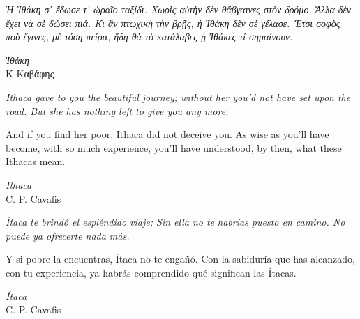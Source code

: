 
%
%
%
\vspace*{0.05\pageheight}
 \setmainfont{CMU Serif}
\epigraph{\itshape
Ἡ Ἰθάκη σ᾿ ἔδωσε τ᾿ ὡραῖο ταξίδι.\linebreak
Χωρὶς αὐτὴν δὲν θἄβγαινες στὸν δρόμο.\linebreak
Ἄλλα δὲν ἔχει νὰ σὲ δώσει πιά.\linebreak\linebreak
Κι ἂν πτωχικὴ τὴν βρῇς, ἡ Ἰθάκη δὲν σὲ γέλασε.\linebreak
Ἔτσι σοφὸς ποὺ ἔγινες, μὲ τόση πείρα,\linebreak
ἤδη θὰ τὸ κατάλαβες ᾑ Ἰθάκες τί σημαίνουν.\linebreak
}{\textit{Ἰθάκη} \\ Κ Καβάφης}

\setmainfont{TeX Gyre Termes X}

\epigraph{\itshape
Ithaca gave to you the beautiful journey;\linebreak
without her you’d not have set upon the road.\linebreak
But she has nothing left to give you any more.\linebreak

And if you find her poor, Ithaca did not deceive you.\linebreak
As wise as you’ll have become, with so much experience,\linebreak
you’ll have understood, by then, what these Ithacas mean.}{\textit{Ithaca} \\ C. P. Cavafis}

\epigraph{\itshape
Ítaca te brindó el espléndido viaje;\linebreak
Sin ella no te habrías puesto en camino.\linebreak
No puede ya ofrecerte nada más.\linebreak

Y si pobre la encuentras, Ítaca no te engañó.\linebreak
Con la sabiduría que has alcanzado, con tu experiencia,\linebreak
ya habrás comprendido qué significan las Ítacas.}{\textit{Ítaca} \\ C. P. Cavafis}



